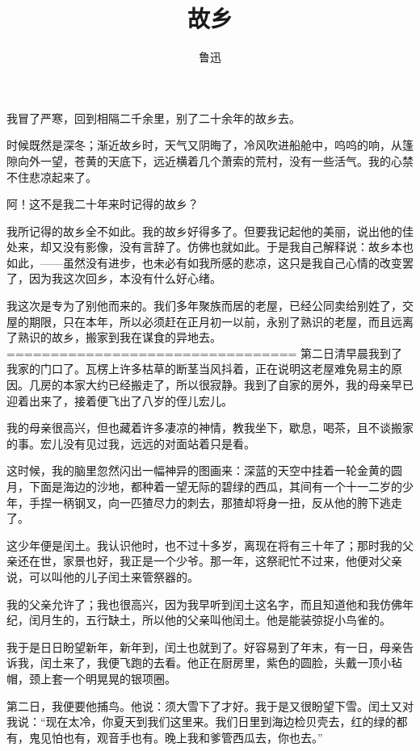 \documentclass[12pt,UTF8]{ctexbook}
\title{\heiti\zihao{0} 故乡}
\author{鲁迅}
\date{}
\begin{document}
\maketitle
\tableofcontents

\frontmatter

我冒了严寒，回到相隔二千余里，别了二十余年的故乡去。

时候既然是深冬；渐近故乡时，天气又阴晦了，冷风吹进船舱中，呜呜的响，从篷隙向外一望，苍黄的天底下，远近横着几个萧索的荒村，没有一些活气。我的心禁不住悲凉起来了。

阿！这不是我二十年来时记得的故乡？

我所记得的故乡全不如此。我的故乡好得多了。但要我记起他的美丽，说出他的佳处来，却又没有影像，没有言辞了。仿佛也就如此。于是我自己解释说：故乡本也如此，——虽然没有进步，也未必有如我所感的悲凉，这只是我自己心情的改变罢了，因为我这次回乡，本没有什么好心绪。

我这次是专为了别他而来的。我们多年聚族而居的老屋，已经公同卖给别姓了，交屋的期限，只在本年，所以必须赶在正月初一以前，永别了熟识的老屋，而且远离了熟识的故乡，搬家到我在谋食的异地去。
=================================
第二日清早晨我到了我家的门口了。瓦楞上许多枯草的断茎当风抖着，正在说明这老屋难免易主的原因。几房的本家大约已经搬走了，所以很寂静。我到了自家的房外，我的母亲早已迎着出来了，接着便飞出了八岁的侄儿宏儿。

我的母亲很高兴，但也藏着许多凄凉的神情，教我坐下，歇息，喝茶，且不谈搬家的事。宏儿没有见过我，远远的对面站着只是看。

这时候，我的脑里忽然闪出一幅神异的图画来：深蓝的天空中挂着一轮金黄的圆月，下面是海边的沙地，都种着一望无际的碧绿的西瓜，其间有一个十一二岁的少年，手捏一柄钢叉，向一匹猹尽力的刺去，那猹却将身一扭，反从他的胯下逃走了。

这少年便是闰土。我认识他时，也不过十多岁，离现在将有三十年了；那时我的父亲还在世，家景也好，我正是一个少爷。那一年，这祭祀忙不过来，他便对父亲说，可以叫他的儿子闰土来管祭器的。

我的父亲允许了；我也很高兴，因为我早听到闰土这名字，而且知道他和我仿佛年纪，闰月生的，五行缺土，所以他的父亲叫他闰土。他是能装弶捉小鸟雀的。

我于是日日盼望新年，新年到，闰土也就到了。好容易到了年末，有一日，母亲告诉我，闰土来了，我便飞跑的去看。他正在厨房里，紫色的圆脸，头戴一顶小毡帽，颈上套一个明晃晃的银项圈。

第二日，我便要他捕鸟。他说：须大雪下了才好。我于是又很盼望下雪。闰土又对我说：“现在太冷，你夏天到我们这里来。我们日里到海边检贝壳去，红的绿的都有，鬼见怕也有，观音手也有。晚上我和爹管西瓜去，你也去。”
\end{document}
